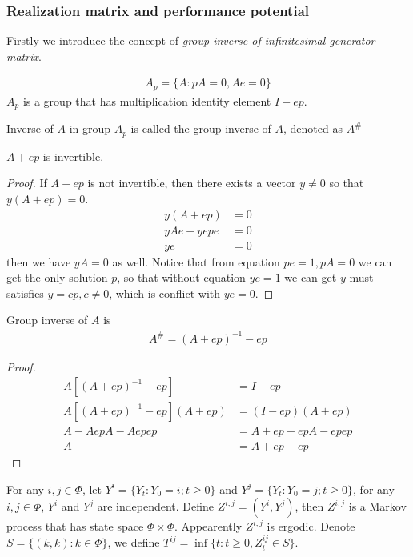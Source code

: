 \documentclass[runningheads]{llncs}
\begin{document}
    \subsubsection{Realization matrix and performance potential}
    Firstly we introduce the concept of \emph{group inverse of infinitesimal generator matrix}.
    \begin{definition}
        \begin{align}
            A_p = \{ A: pA = 0, Ae = 0 \}
        \end{align}
        $A_p$ is a group that has multiplication identity element $I-ep$.
    \end{definition}
    \begin{definition}
        Inverse of $A$ in group $A_p$ is called the group inverse of $A$, denoted as $A^\#$
    \end{definition}
    \begin{lemma}
        $A + ep$ is invertible.
    \end{lemma} 
    \begin{proof}
        If $A + ep$ is not invertible, then there exists a vector $y \neq 0$
        so that $y(A+ep) = 0$.
        \begin{align}
            y(A+ep) &= 0 \\
            yAe + yepe &= 0 \\
            ye &= 0
        \end{align}
        then we have $yA = 0$ as well.
        Notice that from equation $pe = 1, pA = 0$ we can get the only solution
        $p$, so that without equation $ye = 1$ we can get $y$ must satisfies
        $y = cp, c \neq 0$, which is conflict with $ye = 0$.
    \end{proof}
    \begin{lemma}
        Group inverse of $A$ is
        \begin{align}
            A^\# = (A + ep)^{-1} - ep
        \end{align}
    \end{lemma}
    \begin{proof}
        \begin{align}
            A[(A+ep)^{-1} - ep] &= I - ep \\
            A[(A+ep)^{-1} - ep](A + ep) &= (I - ep)(A + ep) \\
            A - AepA - Aepep &= A + ep - epA - epep \\
            A &= A + ep - ep 
        \end{align}
        \end{proof}
    \par
    For any $i, j \in \Phi$, let $Y^{i} = \{ Y_t: Y_0 = i; t \geq 0 \}$ and $Y^{j} = \{ Y_t: Y_0 = j; t \geq 0 \}$,
    for any $i, j \in \Phi$, $Y^i$ and $Y^j$ are independent.
    Define $Z^{i,j} = (Y^i, Y^j)$, then $Z^{i, j}$ is a Markov process that has
    state space $\Phi \times \Phi$. Appearently $Z^{i,j}$ is ergodic.
    Denote $S = \{ (k, k): k \in \Phi \}$,
    we define $T^{ij} = \mathop{\inf} \{ t: t \geq 0, Z^{ij}_t \in S \}$.
    
\end{document}
